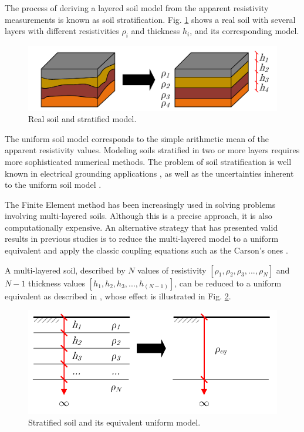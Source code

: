 \documentclass[conference]{IEEEtran}
\begin{document}
The process of deriving a layered soil model from the apparent resistivity measurements is known as soil stratification. Fig. \ref{fig:EstratSolo} shows a real soil with several layers with different resistivities $\rho_i$ and thickness $h_i$, and its corresponding model.

\begin{figure}[!hbt]
	\begin{center}
		\includegraphics[width=1\columnwidth]{fig/EstratSolo2.pdf}
		\caption{Real soil and stratified model.}
		\label{fig:EstratSolo}
	\end{center}
\end{figure}

The uniform soil model corresponds to the simple arithmetic mean of the apparent resistivity values. Modeling soils stratified in two or more layers requires more sophisticated numerical methods. The problem of soil stratification is well known in electrical grounding applications \cite{He2012}, as well as the uncertainties inherent to the uniform soil model \cite{IEEEStd80}.

The Finite Element method has been increasingly used in solving problems involving multi-layered soils. Although this is a precise approach, it is also computationally expensive. An alternative strategy that has presented valid results in previous studies is to reduce the multi-layered model to a uniform equivalent and apply the classic coupling equations such as the Carson's ones \cite{Furlan2015}.

A multi-layered soil, described by $N$ values of resistivity $[\rho_1, \rho_2, \rho_3, ..., \rho_N]$ and $N-1$ thickness values $[h_1, h_2, h_3, ..., h_{(N-1)}]$, can be reduced to a uniform equivalent as described in \cite{Martins-Britto2019}, whose effect is illustrated in Fig. \ref{fig:Hummel}.

\begin{figure}[!hbt]
	\begin{center}
		\includegraphics[width=1\columnwidth]{fig/Hummel2.pdf}
		\caption{Stratified soil and its equivalent uniform model.}
		\label{fig:Hummel}
	\end{center}
\end{figure}
\end{document}
